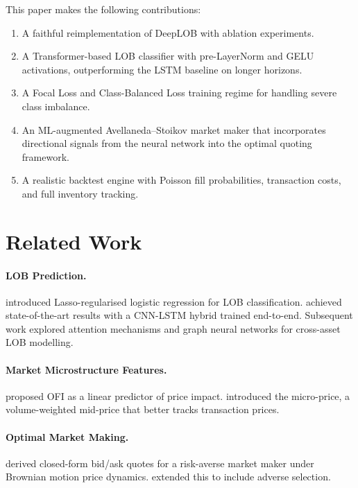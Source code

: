 \documentclass[11pt,a4paper]{article}
\begin{document}
This paper makes the following contributions:
\begin{enumerate}
  \item A faithful reimplementation of DeepLOB \citep{zhang2019deeplob} with
        ablation experiments.
  \item A Transformer-based LOB classifier with pre-LayerNorm and GELU
        activations, outperforming the LSTM baseline on longer horizons.
  \item A Focal Loss \citep{lin2017focal} and Class-Balanced Loss
        \citep{cui2019class} training regime for handling severe class
        imbalance.
  \item An ML-augmented Avellaneda--Stoikov market maker that incorporates
        directional signals from the neural network into the optimal quoting
        framework.
  \item A realistic backtest engine with Poisson fill probabilities,
        transaction costs, and full inventory tracking.
\end{enumerate}

\section{Related Work}
\label{sec:related}

\paragraph{LOB Prediction.}
\citet{kercheval2015modelling} introduced Lasso-regularised logistic
regression for LOB classification.  \citet{zhang2019deeplob} achieved
state-of-the-art results with a CNN-LSTM hybrid trained end-to-end.
Subsequent work explored attention mechanisms \citep{wallbridge2020transformers}
and graph neural networks for cross-asset LOB modelling.

\paragraph{Market Microstructure Features.}
\citet{cont2014price} proposed OFI as a linear predictor of price impact.
\citet{stoikov2018micro} introduced the micro-price, a volume-weighted
mid-price that better tracks transaction prices.

\paragraph{Optimal Market Making.}
\citet{as2008} derived closed-form bid/ask quotes for a risk-averse
market maker under Brownian motion price dynamics.
\citet{cartea2015algorithmic} extended this to include adverse selection.
\end{document}
